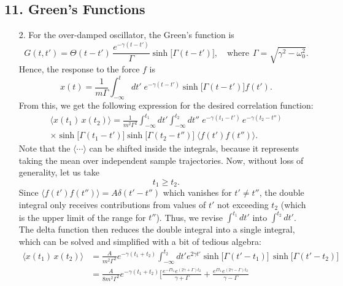 \documentclass[10pt,a4paper]{article}
\begin{document}
\subsection*{11. Green's Functions}

\begin{enumerate}
\item [2.]
For the over-damped oscillator, the Green's function is
\begin{equation}
  G(t,t') = \Theta(t-t')\, \frac{e^{-\gamma(t-t')}}{\Gamma} \sinh\big[\Gamma(t-t')\big], \quad\mathrm{where}\;\,\Gamma = \sqrt{\gamma^2 - \omega_0^2}.
\end{equation}
Hence, the response to the force $f$ is
\begin{equation}
  x(t) = \frac{1}{m\Gamma} \int^t_{-\infty} dt'\; e^{-\gamma(t-t')} \sinh\big[\Gamma(t-t')\big] f(t').
\end{equation}
From this, we get the following expression for the desired correlation
function:
\begin{multline}
  \langle x(t_1)\, x(t_2)\rangle = \frac{1}{m^2\Gamma^2} \int^{t_1}_{-\infty} dt' \int^{t_2}_{-\infty} dt'' \; e^{-\gamma(t_1-t')}\, e^{-\gamma(t_2-t'')} \\
  \times \sinh\big[\Gamma(t_1-t')\big] \sinh\big[\Gamma(t_2-t'')\big] \;
  \langle f(t') f(t'')\rangle.
\end{multline}
Note that the $\langle\cdots\rangle$ can be shifted inside the
integrals, because it represents taking the mean over independent sample
trajectories. Now, without loss of generality, let us take
\begin{equation}
  t_1 \ge t_2.
\end{equation}
Since $\langle f(t') f(t'')\rangle = A \delta(t'-t'')$ which vanishes
for $t' \ne t''$, the double integral only receives contributions from
values of $t'$ not exceeding $t_2$ (which is the upper limit of the
range for $t''$). Thus, we revise $\int^{t_1} dt'$ into $\int^{t_2}
dt'$. The delta function then reduces the double integral into a
single integral, which can be solved and simplified with a bit of
tedious algebra:
\begin{align}
  \langle x(t_1)\, x(t_2)\rangle &= \frac{A}{m^2\Gamma^2} e^{-\gamma(t_1+t_2)} \int^{t_2}_{-\infty} dt' e^{2\gamma t'} \sinh\big[\Gamma(t'-t_1)\big] \, \sinh\big[\Gamma(t'-t_2)\big] \\
  &= \frac{A}{8m^2\Gamma^2} e^{-\gamma(t_1+t_2)}\Bigg[\frac{e^{-\Gamma t_1} e^{(2\gamma+\Gamma)t_2}}{\gamma+\Gamma} + \frac{e^{\Gamma t_1}e^{(2\gamma-\Gamma)t_2}}{\gamma-\Gamma} \nonumber \\

\end{align}
\end{enumerate}
\end{document}
